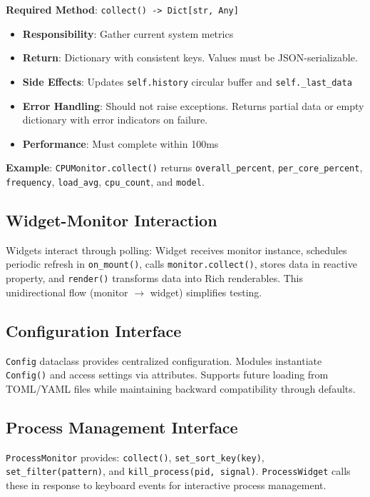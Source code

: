 \documentclass[12pt,a4paper,oneside]{report}
\begin{document}
\textbf{Required Method}: \texttt{collect() -> Dict[str, Any]}

\begin{itemize}
    \item \textbf{Responsibility}: Gather current system metrics
    \item \textbf{Return}: Dictionary with consistent keys. Values must be JSON-serializable.
    \item \textbf{Side Effects}: Updates \texttt{self.history} circular buffer and \texttt{self.\_last\_data}
    \item \textbf{Error Handling}: Should not raise exceptions. Returns partial data or empty dictionary with error indicators on failure.
    \item \textbf{Performance}: Must complete within 100ms
\end{itemize}

\textbf{Example}: \texttt{CPUMonitor.collect()} returns \texttt{overall\_percent}, \texttt{per\_core\_percent}, \texttt{frequency}, \texttt{load\_avg}, \texttt{cpu\_count}, and \texttt{model}.

\subsection{Widget-Monitor Interaction}

Widgets interact through polling: Widget receives monitor instance, schedules periodic refresh in \texttt{on\_mount()}, calls \texttt{monitor.collect()}, stores data in reactive property, and \texttt{render()} transforms data into Rich renderables. This unidirectional flow (monitor $\rightarrow$ widget) simplifies testing.

\subsection{Configuration Interface}

\texttt{Config} dataclass provides centralized configuration. Modules instantiate \texttt{Config()} and access settings via attributes. Supports future loading from TOML/YAML files while maintaining backward compatibility through defaults.

\subsection{Process Management Interface}

\texttt{ProcessMonitor} provides: \texttt{collect()}, \texttt{set\_sort\_key(key)}, \texttt{set\_filter(pattern)}, and \texttt{kill\_process(pid, signal)}. \texttt{ProcessWidget} calls these in response to keyboard events for interactive process management.
\end{document}
